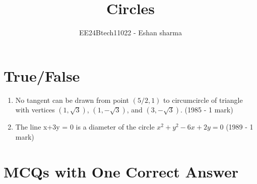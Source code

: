 \documentclass[journal,12pt,twocolumn]{IEEEtran}
\theoremstyle{remark}
\begin{document}

\vspace{3cm}

\title{Circles}
\author{EE24Btech11022 - Eshan sharma}
\maketitle
\newpage
\bigskip

\renewcommand{\thefigure}{\theenumi}
\renewcommand{\thetable}{\theenumi}


\section{True/False}


\begin{enumerate}
    \item No tangent can be drawn from point $(5/2, 1)$ to circumcircle of triangle with vertices $(1, \sqrt{3})$, $(1, -\sqrt{3})$, and $(3, -\sqrt{3})$.
    \hfill{(1985 - 1 mark)}
    \item The line x+3y = 0 is a diameter of the circle $ x^{2} + y^{2} - 6x +2y = 0$
    \hfill{(1989 - 1 mark)}
\end{enumerate}

\section{MCQs with One Correct Answer}
\end{document}
